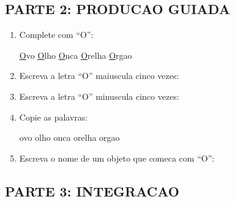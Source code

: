 \begin{exercicio}
\subsection*{PARTE 2: PRODUCAO GUIADA}

\begin{enumerate}[resume]
  \item Complete com ``O'':
  \begin{center}
  \underline{O}vo \quad \underline{O}lho \quad \underline{O}nca \quad \underline{O}relha \quad \underline{O}rgao
  \end{center}

  \item Escreva a letra ``O'' maiuscula cinco vezes:
  \begin{center}
  \underline{\hspace{1.5cm}} \quad \underline{\hspace{1.5cm}} \quad \underline{\hspace{1.5cm}} \quad \underline{\hspace{1.5cm}} \quad \underline{\hspace{1.5cm}}
  \end{center}

  \item Escreva a letra ``O'' minuscula cinco vezes:
  \begin{center}
  \underline{\hspace{1.5cm}} \quad \underline{\hspace{1.5cm}} \quad \underline{\hspace{1.5cm}} \quad \underline{\hspace{1.5cm}} \quad \underline{\hspace{1.5cm}}
  \end{center}

  \item Copie as palavras:
  \begin{center}
  ovo \quad olho \quad onca \quad orelha \quad orgao
  \end{center}

  \item Escreva o nome de um objeto que comeca com ``O'':
  \begin{center}
  \underline{\hspace{6cm}}
  \end{center}
\end{enumerate}

\subsection*{PARTE 3: INTEGRACAO}


\end{exercicio}
